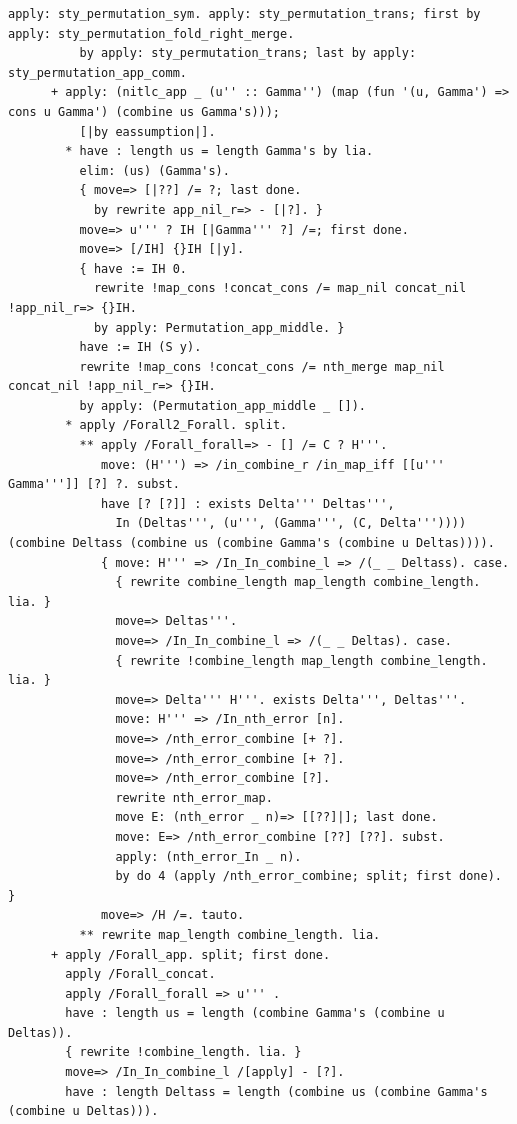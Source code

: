 \begin{lstlisting}[style=authorcoq]
          apply: sty_permutation_sym. apply: sty_permutation_trans; first by apply: sty_permutation_fold_right_merge.
          by apply: sty_permutation_trans; last by apply: sty_permutation_app_comm.
      + apply: (nitlc_app _ (u'' :: Gamma'') (map (fun '(u, Gamma') => cons u Gamma') (combine us Gamma's)));
          [|by eassumption|].
        * have : length us = length Gamma's by lia.
          elim: (us) (Gamma's).
          { move=> [|??] /= ?; last done.
            by rewrite app_nil_r=> - [|?]. }
          move=> u''' ? IH [|Gamma''' ?] /=; first done.
          move=> [/IH] {}IH [|y].
          { have := IH 0.
            rewrite !map_cons !concat_cons /= map_nil concat_nil !app_nil_r=> {}IH.
            by apply: Permutation_app_middle. }
          have := IH (S y).
          rewrite !map_cons !concat_cons /= nth_merge map_nil concat_nil !app_nil_r=> {}IH.
          by apply: (Permutation_app_middle _ []).
        * apply /Forall2_Forall. split.
          ** apply /Forall_forall=> - [] /= C ? H'''.
             move: (H''') => /in_combine_r /in_map_iff [[u''' Gamma''']] [?] ?. subst.
             have [? [?]] : exists Delta''' Deltas''', 
               In (Deltas''', (u''', (Gamma''', (C, Delta''')))) (combine Deltass (combine us (combine Gamma's (combine u Deltas)))).
             { move: H''' => /In_In_combine_l => /(_ _ Deltass). case.
               { rewrite combine_length map_length combine_length. lia. }
               move=> Deltas'''.
               move=> /In_In_combine_l => /(_ _ Deltas). case.
               { rewrite !combine_length map_length combine_length. lia. }
               move=> Delta''' H'''. exists Delta''', Deltas'''.
               move: H''' => /In_nth_error [n].
               move=> /nth_error_combine [+ ?].
               move=> /nth_error_combine [+ ?].
               move=> /nth_error_combine [?].
               rewrite nth_error_map.
               move E: (nth_error _ n)=> [[??]|]; last done.
               move: E=> /nth_error_combine [??] [??]. subst.
               apply: (nth_error_In _ n).
               by do 4 (apply /nth_error_combine; split; first done). }
             move=> /H /=. tauto.
          ** rewrite map_length combine_length. lia.
      + apply /Forall_app. split; first done.
        apply /Forall_concat.
        apply /Forall_forall => u''' .
        have : length us = length (combine Gamma's (combine u Deltas)).
        { rewrite !combine_length. lia. }
        move=> /In_In_combine_l /[apply] - [?].
        have : length Deltass = length (combine us (combine Gamma's (combine u Deltas))).

\end{lstlisting}
